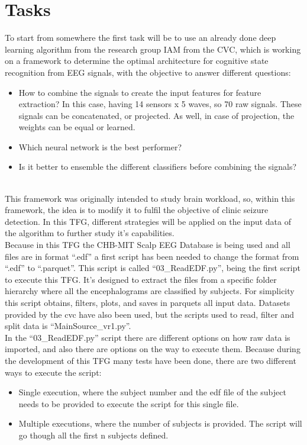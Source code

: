 ﻿\documentclass[10pt,a4paper,twocolumn,twoside]{article}
\begin{document}
\section{Tasks}
\label{sec-tasks}
To start from somewhere the first task will be to use an already done deep learning algorithm from the research group IAM from the CVC, which is working on a framework to determine the optimal architecture for cognitive state recognition from EEG signals, with the objective to answer different questions:
\begin{itemize}
  \item How to combine the signals to create the input features for feature extraction? In this case, having 14 sensors x 5 waves, so 70 raw signals. These signals can be concatenated, or projected. As well, in case of projection, the weights can be equal or learned.
  \item Which neural network is the best performer?
  \item Is it better to ensemble the different classifiers before combining the signals?
\end{itemize}
\leavevmode\\
This framework was originally intended to study brain workload, so, within this framework, the idea is to modify it to fulfil the objective of clinic seizure detection. In this TFG, different strategies will be applied on the input data of the algorithm to further study it’s capabilities.
\\
Because in this TFG the CHB-MIT Scalp EEG Database\cite{goldberger2000physiobank} is being used and all files are in format “.edf” a first script has been needed to change the format from “.edf” to “.parquet”. This script is called “03\_ReadEDF.py”, being the first script to execute this TFG. It’s designed to extract the files from a specific folder hierarchy where all the encephalograms are classified by subjects. For simplicity this script obtains, filters, plots, and saves in parquets all input data. Datasets provided by the cvc have also been used, but the scripts used to read, filter and split data is “MainSource\_vr1.py”.
\\
In the “03\_ReadEDF.py” script there are different options on how raw data is imported, and also there are options on the way to execute them. Because during the development of this TFG many tests have been done, there are two different ways to execute the script:
\\
\begin{itemize}
  \item Single execution, where the subject number and the edf file of the subject needs to be provided to execute the script for this single file. 
  \item Multiple executions, where the number of subjects is provided. The script will go though all the first n subjects defined.
\end{itemize}
\end{document}
